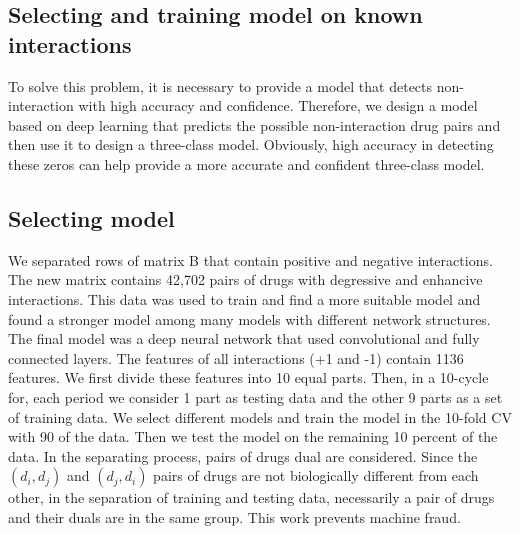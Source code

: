 \documentclass{bmcart}
\begin{document}
\subsection*{Selecting and training model on known interactions}
To solve this problem, it is necessary to provide a model that detects non-interaction with high accuracy and confidence. Therefore, we design a model based on deep learning that predicts the possible non-interaction drug pairs and then use it to design a three-class model. Obviously, high accuracy in detecting these zeros can help provide a more accurate and confident three-class model.


\subsection*{Selecting model\label{Selecting model}}
We separated rows of matrix B that contain positive and negative interactions. The new matrix contains 42,702 pairs of drugs with degressive and enhancive interactions. This data was used to train and find a more suitable model and found a stronger model among many models with different network structures. The final model was a deep neural network that used convolutional and fully connected layers. The features of all interactions (+1 and -1) contain 1136 features. We first divide these features into 10 equal parts. Then, in a 10-cycle for, each period we consider 1 part as testing data and the other 9 parts as a set of training data. We select different models and train the model in the 10-fold CV with 90  of the data. Then we test the model on the remaining 10 percent of the data. In the separating process, pairs of drugs dual are considered. Since the $ (d_i, d_j) $ and $ (d_j, d_i) $ pairs of drugs are not biologically different from each other, in the separation of training and testing data, necessarily a pair of drugs and their duals are in the same group. This work prevents machine fraud.
\end{document}

